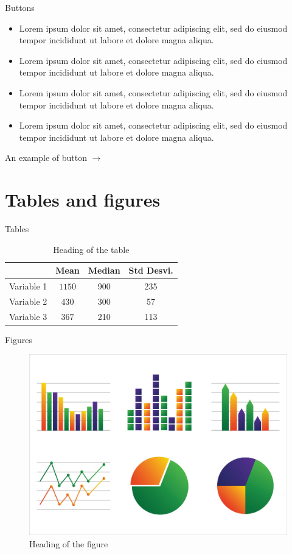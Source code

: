 \documentclass[10pt,numbering,toc,wide]{bpslides}
\begin{document}
\begin{frame}{Buttons}
    \vfill
\begin{itemize}
\item Lorem ipsum dolor sit amet, consectetur adipiscing elit, sed do eiusmod tempor incididunt ut labore et dolore magna aliqua.
\item Lorem ipsum dolor sit amet, consectetur adipiscing elit, sed do eiusmod tempor incididunt ut labore et dolore magna aliqua.
\item Lorem ipsum dolor sit amet, consectetur adipiscing elit, sed do eiusmod tempor incididunt ut labore et dolore magna aliqua.
\item Lorem ipsum dolor sit amet, consectetur adipiscing elit, sed do eiusmod tempor incididunt ut labore et dolore magna aliqua.
\end{itemize}
\vfill
\hfill An example of button $\to$ 
\end{frame}

\section{Tables and figures}

\begin{frame}{Tables}
\begin{table}
\centering
\caption{Heading of the table}
\begin{tabular}{cccc} \toprule
 & Mean & Median & Std Desvi.\\ \midrule
Variable 1 & $1150$ & 900 & 235 \\ 
Variable 2 & $430$ & 300 & 57 \\ 
Variable 3 & $367$ & 210 & 113 \\ \bottomrule
\end{tabular}
\end{table}
\end{frame}

\begin{frame}{Figures}
\begin{figure}
\centering
\caption{Heading of the figure}
\includegraphics[width=0.9\paperheight]{graph}
\end{figure}
\end{frame}
\end{document}
